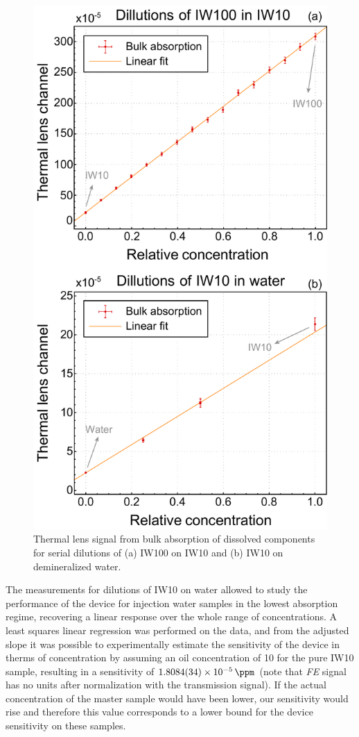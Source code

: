 \documentclass[9pt,twocolumn,twoside]{osajnl}
\newcommand{\FE}{\textit{FE}}
\begin{document}
\begin{figure}[t!]
	\centering \includegraphics[width=.46\textwidth]{figures/IWvsC.pdf}
	\caption{Thermal lens signal from bulk absorption of dissolved components for serial dilutions of (a) IW100 on IW10 and (b) IW10 on demineralized water.}
	\label{fig:BulkAbsorption}
\end{figure}

The measurements for dilutions of IW10 on water allowed to study the performance of the device for injection water samples in the lowest absorption regime, recovering a linear response over the whole range of concentrations. A least squares linear regression was performed on the data, and from the adjusted slope it was possible to experimentally estimate the sensitivity of the device in therms of concentration by assuming an oil concentration of \SI{10}{\ppm} for the pure IW10 sample, resulting in a sensitivity of $\SI{1.8084(34)d-5}{\per\ppm}$ (note that \FE{} signal has no units after normalization with the transmission signal). If the actual concentration of the master sample would have been lower, our sensitivity would rise and therefore this value corresponds to a lower bound for the device sensitivity on these samples.
\end{document}
